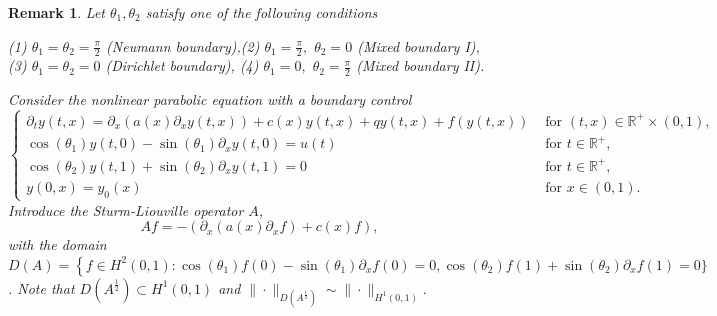 \documentclass[review]{elsarticle}
\newtheorem{remark}[theorem]{Remark}
\numberwithin{equation}{section}
\begin{document}
\begin{remark}
 Let $\theta_1,\theta_2$ satisfy one of the following conditions
        \begin{center}
             (1) $\theta_1=\theta_2=\frac{\pi}{2}$ (Neumann boundary),\quad(2)  $\theta_1=\frac{\pi}{2},$ $ \theta_2=0$ (Mixed boundary I),\\
            (3) $\theta_1=\theta_2=0$ (Dirichlet boundary),  \quad(4) $\theta_1=0,$ $ \theta_2=\frac{\pi}{2}$ (Mixed boundary II).
        \end{center} Consider the nonlinear parabolic equation with a boundary control
\begin{equation}\label{parabolic-sys}
\left\{\begin{array}{ll}
 \partial_t y(t,x) =\partial_x (a(x)\partial_x y( t,x))+c(x)y( t,x) +qy( t,x)+f(y( t,x))&\text{ for }(t,x)\in \mathbb{R}^+\times (0,1),\\[2mm]
\cos(\theta_1)y(t,0)-\sin(\theta_1)\partial_x y(t,0)=u(t)&\text{ for }t\in \mathbb{R}^+,\\[2mm]
\cos(\theta_2)y(t,1)+\sin(\theta_2)\partial_x y(t,1)=0&\text{ for }t\in \mathbb{R}^+,\\[2mm]
y(0,x)=y_0(x )&\text{ for }x\in (0,1).
\end{array}\right.
 \end{equation}
Introduce the Sturm-Liouville operator $A$,
\begin{equation*}\label{S-L}
       Af=-(\partial_x (a(x)\partial_x f)+c(x)f), 
        \end{equation*}
        with the domain $D( A)=\left\{f\in H^2(0,1):\cos(\theta_1)f(0)-\sin(\theta_1)\partial_x f(0)=0,\cos(\theta_2)f(1)+\sin(\theta_2)\partial_x f(1)=0\}\right.$.  
       Note that $D(A^{\frac{1}{2}})\subset H^1(0,1)$ {and $\|\cdot\|_{D(A^{\frac{1}{2}})}\sim \|\cdot\|_{H^1(0,1)}.$}
       

\end{remark}
\end{document}
